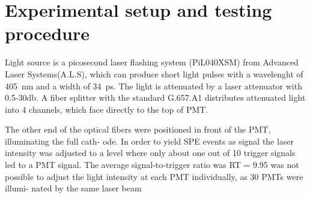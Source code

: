 \section{Experimental setup and testing procedure}
\label{SetUp}
Light source is a picosecond laser flashing system (PiL040XSM) from Advanced Laser Systems(A.L.S)\cite{NTKLaser}, which can produce short light pulses with a wavelenght of \SI{405}{nm} and a width of \SI{34}{ps}. The light is attenuated by a laser attenuator with 0.5-30db. A fiber splitter with the standard G.657.A1 distributes attenuated light into 4 channels, which face directly to the top of PMT.

The other end of the optical fibers were positioned in front of the PMT, illuminating the full cath-
ode. In order to yield SPE events as signal the laser intensity was adjusted to a level where only
about one out of 10 trigger signals led to a PMT signal. The average signal-to-trigger ratio was
RT = 9.95 %
was not possible to adjust the light intensity at each PMT individually, as 30 PMTs were illumi-
nated by the same laser beam